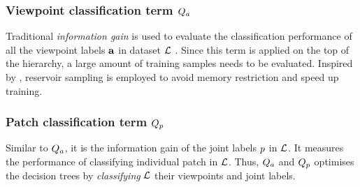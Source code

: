 \subsubsection{Viewpoint classification term $Q_{a}$} 
Traditional \emph{information gain} is used to evaluate the classification performance of all the viewpoint labels $\mathbf{a}$ in dataset $\mathcal{L}$ \cite{Breiman2001}. Since this term is applied on the top of the hierarchy, a large amount of training samples needs to be evaluated. Inspired by \cite{Girshick2011}, reservoir sampling is employed to avoid memory restriction and speed up training. 

\subsubsection{Patch classification term $Q_{p}$} 
Similar to $Q_{a}$, it is the information gain of the joint labels $p$ in $\mathcal{L}$. It measures the performance of classifying individual patch in $\mathcal{L}$. 
Thus, $Q_{a}$ and $Q_{p}$ optimises the decision trees by \emph{classifying} $\mathcal{L}$ their viewpoints and joint labels. 

